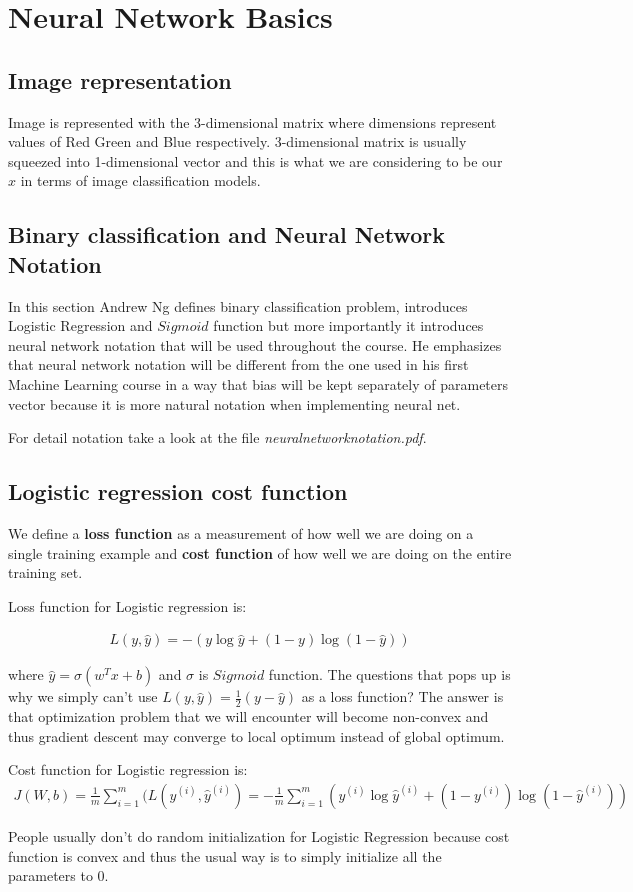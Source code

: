 \documentclass[a4paper]{report}
\begin{document}
\section{Neural Network Basics}

\subsection{Image representation}
Image is represented with the 3-dimensional matrix where dimensions represent values of Red Green and Blue respectively. 3-dimensional matrix is usually squeezed into 1-dimensional vector and this is what we are considering to be our $x$ in terms of image classification models.

\subsection{Binary classification and Neural Network Notation}
In this section Andrew Ng defines binary classification problem, introduces Logistic Regression and $Sigmoid$ function but more importantly it introduces neural network notation that will be used throughout the course. He emphasizes that neural network notation will be different from the one used in his first Machine Learning course in a way that bias will be kept separately of parameters vector because it is more natural notation when implementing neural net.

For detail notation take a look at the file \textit{neuralnetworknotation.pdf}.

\subsection{Logistic regression cost function}
We define a \textbf{loss function} as a measurement of how well we are doing on a single training example and \textbf{cost function} of how well we are doing on the entire training set.

Loss function for Logistic regression is:

\begin{align}
L(y, \hat{y}) = -(y\log{\hat{y}} + (1 - y)\log{(1 - \hat{y})})
\end{align}

where $\hat{y} = \sigma(w^Tx + b)$ and $\sigma$ is $Sigmoid$ function.
The questions that pops up is why we simply can't use $L(y, \hat{y}) = \frac{1}{2}(y - \hat{y})$ as a loss function? The answer is that optimization problem that we will encounter will become non-convex and thus gradient descent may converge to local optimum instead of global optimum.

Cost function for Logistic regression is:
\begin{align}
J(W, b) = \frac{1}{m}\sum_{i = 1}^{m}(L(y^{(i)}, \hat{y}^{(i)}) = -\frac{1}{m}\sum_{i = 1}^{m}(y^{(i)}\log{\hat{y}^{(i)}} + (1 - y^{(i)})\log{(1 - \hat{y}^{(i)})})
\end{align}

People usually don't do random initialization for Logistic Regression because cost function is convex and thus the usual way is to simply initialize all the parameters to $0$.
\end{document}
